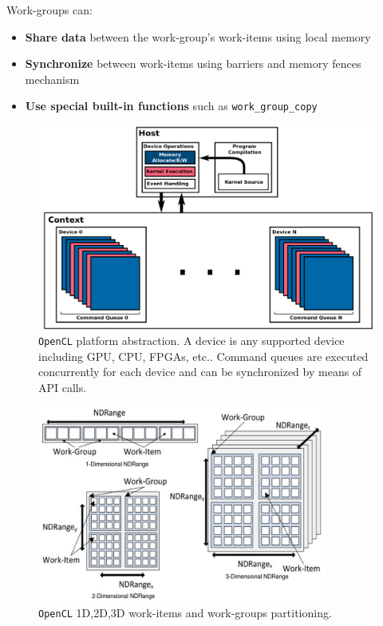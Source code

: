 \begin{description}
    Work-groups can:
    \begin{itemize}
		\item \textbf{Share data} between the work-group's work-items using local memory
		\item \textbf{Synchronize} between work-items using barriers and memory fences mechanism
		\item \textbf{Use special built-in functions} such as \texttt{work\_group\_copy}
    \end{itemize}

    \begin{figure}
	\centering
	\includegraphics[width=1.0\textwidth]{./images/parallel_programming/openCL}
	\caption[\texttt{OpenCL} platform abstraction.]{\texttt{OpenCL} platform abstraction. A device is any supported device including GPU, CPU, FPGAs, etc.. Command queues are executed concurrently for each device and can be synchronized by means of API calls.}
	\label{fig:openCL_platform}
\end{figure}

    \begin{figure}
	\centering
	\includegraphics[width=0.85\textwidth]{./images/parallel_programming/opencl_execmodel}
	\caption{\texttt{OpenCL} 1D,2D,3D work-items and work-groups partitioning. }\label{fig:opencl_execmodel}
\end{figure}


\end{description}
